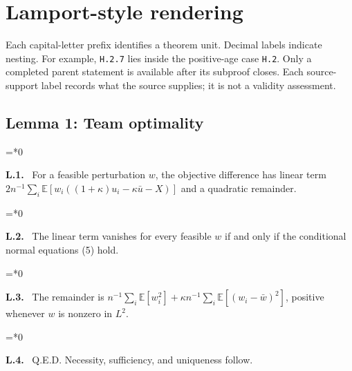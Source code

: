 \documentclass[11pt,letterpaper]{article}
\newcommand{\E}{\mathbb E}
\newenvironment{proofstep}[2]{%
  \begin{list}{}{\leftmargin=\dimexpr 0.17in*#2\relax%
  \setlength{\rightmargin}{0pt}\setlength{\topsep}{5pt}\setlength{\parsep}{2pt}}%
  \item[]\textbf{\textcolor{ink}{#1.}}\ }{\end{list}}
\begin{document}
\section{Lamport-style rendering}
Each capital-letter prefix identifies a theorem unit. Decimal labels indicate nesting. For example, \texttt{H.2.7} lies inside the positive-age case \texttt{H.2}. Only a completed parent statement is available after its subproof closes. Each source-support label records what the source supplies; it is not a validity assessment.

\subsection{Lemma 1: Team optimality}
\begin{proofstep}{L.1}{0}
For a feasible perturbation $w$, the objective difference has linear term $2n^{-1}\sum_i\E[w_i((1+\kappa)u_i-\kappa\bar u-X)]$ and a quadratic remainder.
\par\nopagebreak{}
\end{proofstep}
\begin{proofstep}{L.2}{0}
The linear term vanishes for every feasible $w$ if and only if the conditional normal equations (5) hold.
\par\nopagebreak{}
\end{proofstep}
\begin{proofstep}{L.3}{0}
The remainder is $n^{-1}\sum_i\E[w_i^2]+\kappa n^{-1}\sum_i\E[(w_i-\bar w)^2]$, positive whenever $w$ is nonzero in $L^2$.
\par\nopagebreak{}
\end{proofstep}
\begin{proofstep}{L.4}{0}
Q.E.D. Necessity, sufficiency, and uniqueness follow.
\par\nopagebreak{}
\end{proofstep}
\end{document}
